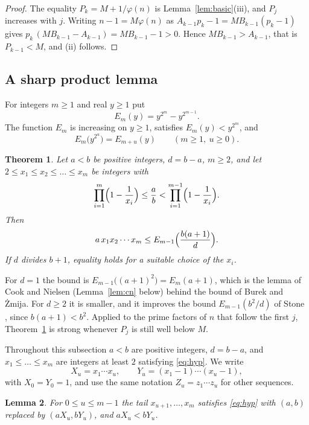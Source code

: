 \documentclass[11pt,reqno]{amsart}
\numberwithin{equation}{section}
\theoremstyle{plain}
\newtheorem{theorem}{Theorem}[section]
\newtheorem{lemma}[theorem]{Lemma}
\theoremstyle{definition}
\theoremstyle{remark}
\begin{document}
\begin{proof}
The equality $P_k=M+1/\varphi(n)$ is Lemma~\ref{lem:basic}(iii), and
$P_j$ increases with $j$. Writing $n-1=M\varphi(n)$ as
$A_{k-1}p_k-1=MB_{k-1}(p_k-1)$ gives
$p_k\,(MB_{k-1}-A_{k-1})=MB_{k-1}-1>0$. Hence $MB_{k-1}>A_{k-1}$, that
is $P_{k-1}<M$, and (ii) follows.
\end{proof}

\subsection{A sharp product lemma}\label{sec:product}
For integers $m\ge1$ and real $y\ge1$ put
\[
  E_m(y)=y^{2^m}-y^{2^{m-1}} .
\]
The function $E_m$ is increasing on $y\ge1$, satisfies
$E_m(y)<y^{2^m}$, and
\begin{equation}\label{eq:Ecomp}
  E_m\bigl(y^{2^u}\bigr)=E_{m+u}(y)\qquad(m\ge1,\ u\ge0).
\end{equation}

\begin{theorem}\label{thm:deficit}
Let $a<b$ be positive integers, $d=b-a$, $m\ge2$, and let
$2\le x_1\le x_2\le\dots\le x_m$ be integers with
\begin{equation}\label{eq:hyp}
  \prod_{i=1}^{m}\Bigl(1-\frac1{x_i}\Bigr)\le\frac ab
  <\prod_{i=1}^{m-1}\Bigl(1-\frac1{x_i}\Bigr).
\end{equation}
Then
\[
  a\,x_1x_2\cdots x_m\le E_{m-1}\Bigl(\frac{b(a+1)}{d}\Bigr).
\]
If $d$ divides $b+1$, equality holds for a suitable choice of the
$x_i$.
\end{theorem}

For $d=1$ the bound is $E_{m-1}\bigl((a+1)^2\bigr)=E_m(a+1)$, which is
the lemma of Cook and Nielsen (Lemma~\ref{lem:cn} below) behind the
bound of Burek and \.Zmija. For $d\ge2$ it is smaller, and it improves
the bound $E_{m-1}(b^2/d)$ of Stone \cite[Corollary~1]{Sto24}, since
$b(a+1)<b^2$. Applied to the prime factors of $n$ that follow the
first $j$, Theorem~\ref{thm:deficit} is strong whenever $P_j$ is still
well below $M$.

Throughout this subsection $a<b$ are positive integers, $d=b-a$, and
$x_1\le\dots\le x_m$ are integers at least $2$ satisfying
\eqref{eq:hyp}. We write
\[
  X_u=x_1\cdots x_u,\qquad Y_u=(x_1-1)\cdots(x_u-1),
\]
with $X_0=Y_0=1$, and use the same notation $Z_u=z_1\cdots z_u$ for
other sequences.

\begin{lemma}\label{lem:tail}
For $0\le u\le m-1$ the tail $x_{u+1},\dots,x_m$ satisfies
\eqref{eq:hyp} with $(a,b)$ replaced by $(aX_u,bY_u)$, and
$aX_u<bY_u$.
\end{lemma}
\end{document}
